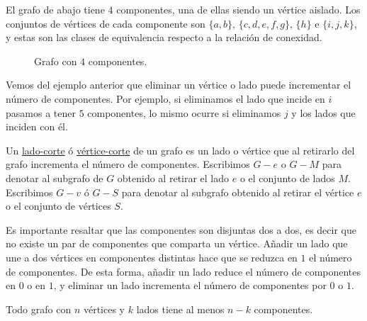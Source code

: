 \begin{ejem}\label{ejem:cortes}
    El grafo de abajo tiene $4$ componentes, una de ellas siendo un vértice aislado. Los conjuntos de vértices de cada componente son $\{a,b\}$, $\{c,d,e,f,g\}$, $\{h\}$ e $\{i,j,k\}$, y estas son las clases de equivalencia respecto a la relación de conexidad.
    
    \begin{figure}
        \centering
        \caption{Grafo con $4$ componentes.}
    \end{figure}
\end{ejem}

Vemos del ejemplo anterior que eliminar un vértice o lado puede incrementar el número de componentes. Por ejemplo, si eliminamos el lado que incide en $i$ pasamos a tener $5$ componentes, lo mismo ocurre si eliminamos $j$ y los lados que inciden con él.

\begin{defn}
    Un \ul{lado-corte} ó \ul{vértice-corte} de un grafo es un lado o vértice que al retirarlo del grafo incrementa el número de componentes. Escribimos $G - e$ o $G - M$ para denotar al subgrafo de $G$ obtenido al retirar el lado $e$ o el conjunto de lados $M$. Escribimos $G - v$ ó $G - S$ para denotar al subgrafo obtenido al retirar el vértice $e$ o el conjunto de vértices $S$.
\end{defn}

Es importante resaltar que las componentes son disjuntas dos a dos, es decir que no existe un par de componentes que comparta un vértice. Añadir un lado que une a dos vértices en componentes distintas hace que se reduzca en $1$ el número de componentes. De esta forma, añadir un lado reduce el número de componentes en $0$ o en $1$, y eliminar un lado incrementa el número de componentes por $0$ o $1$.

\begin{pro}
    Todo grafo con $n$ vértices y $k$ lados tiene al menos $n-k$ componentes.
\end{pro}

